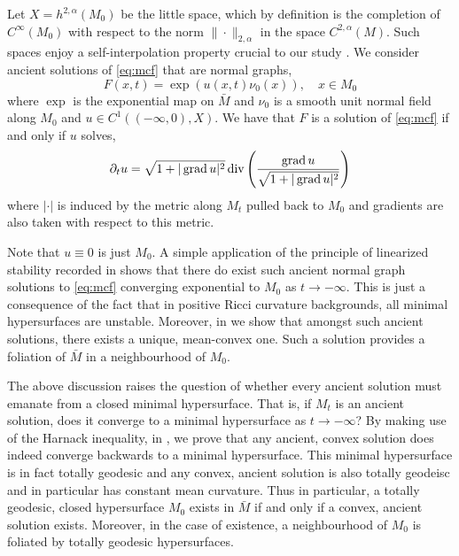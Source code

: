 \documentclass{amsart}
\begin{document}
Let \(X = h^{2,\alpha}(M_0)\) be the little \holder{} space, which by definition is the completion of \(C^{\infty}(M_0)\) with respect to the \holder{} norm \(\|\cdot\|_{2,\alpha}\) in the \holder{} space \(C^{2,\alpha}(M)\). Such spaces enjoy a self-interpolation property crucial to our study \cite[Equation 19]{guenther2002stability}. We consider ancient solutions of \eqref{eq:mcf} that are normal graphs,
\[
F(x, t) = \exp(u(x, t) \nu_0(x)), \quad x \in M_0
\]
where \(\exp\) is the exponential map on \(\bar{M}\) and \(\nu_0\) is a smooth unit normal field along \(M_0\) and \(u \in C^1((-\infty, 0), X)\). We have that \(F\) is a solution of \eqref{eq:mcf} if and only if \(u\) solves,
\begin{equation}
\label{eq:graph_mcf}
\partial_t u = \sqrt{1 + |\operatorname{grad} u|^2} \operatorname{div}\left(\frac{\operatorname{grad} u}{\sqrt{1 + |\operatorname{grad} u|^2}}\right)
\end{equation}
where \(|\cdot|\) is induced by the metric along \(M_t\) pulled back to \(M_0\) and gradients are also taken with respect to this metric.

Note that \(u \equiv 0\) is just \(M_0\). A simple application of the principle of linearized stability recorded in  shows that there do exist such ancient normal graph solutions to \eqref{eq:mcf} converging exponential to \(M_0\) as \(t \to - \infty\). This is just a consequence of the fact that in positive Ricci curvature backgrounds, all minimal hypersurfaces are unstable. Moreover, in  we show that amongst such ancient solutions, there exists a unique, mean-convex one. Such a solution provides a foliation of \(\bar{M}\) in a neighbourhood of \(M_0\).

The above discussion raises the question of whether every ancient solution must emanate from a closed minimal hypersurface. That is, if \(M_t\) is an ancient solution, does it converge to a minimal hypersurface as \(t \to -\infty\)? By making use of the Harnack inequality, in , we prove that any ancient, convex solution does indeed converge backwards to a minimal hypersurface. This minimal hypersurface is in fact totally geodesic and any convex, ancient solution is also totally geodeisc and in particular has constant mean curvature. Thus in particular, a totally geodesic, closed hypersurface \(M_0\) exists in \(\bar{M}\) if and only if a convex, ancient solution exists. Moreover, in the case of existence, a neighbourhood of \(M_0\) is foliated by totally geodesic hypersurfaces.
\end{document}

